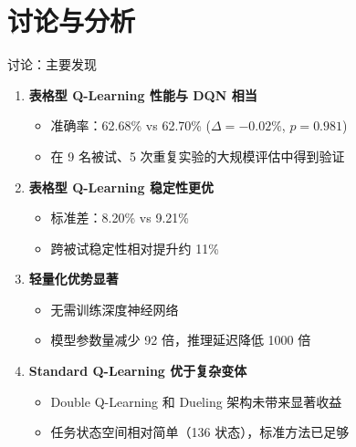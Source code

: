 \section{讨论与分析}

\begin{frame}{讨论：主要发现}
    \begin{enumerate}
        \item \textbf{\color{primaryblue}表格型 Q-Learning 性能与 DQN 相当}
        \begin{itemize}
            \item 准确率：62.68\% vs 62.70\% ($\Delta = -0.02\%$, $p = 0.981$)
            \item 在 9 名被试、5 次重复实验的大规模评估中得到验证
        \end{itemize}

        \vspace{0.5em}
        \item \textbf{\color{primaryblue}表格型 Q-Learning 稳定性更优}
        \begin{itemize}
            \item 标准差：8.20\% vs 9.21\%
            \item 跨被试稳定性相对提升约 11\%
        \end{itemize}

        \vspace{0.5em}
        \item \textbf{\color{primaryblue}轻量化优势显著}
        \begin{itemize}
            \item 无需训练深度神经网络
            \item 模型参数量减少 92 倍，推理延迟降低 1000 倍
        \end{itemize}

        \vspace{0.5em}
        \item \textbf{\color{primaryblue}Standard Q-Learning 优于复杂变体}
        \begin{itemize}
            \item Double Q-Learning 和 Dueling 架构未带来显著收益
            \item 任务状态空间相对简单（136 状态），标准方法已足够
        \end{itemize}
    \end{enumerate}
\end{frame}

